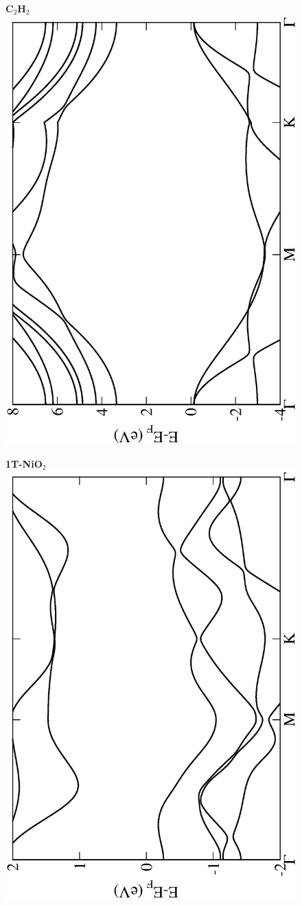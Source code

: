 \begin{figure}[htbp]
\centering
{\bfseries \sffamily C$_{2}$H$_{2}$}\\
\includegraphics[width=0.45\linewidth, angle=-90, trim={2.9cm, 0cm, 2cm, 0cm}, clip]{img/SI_figs/BS/Graphane.eps}
\end{figure}

\begin{figure}[htbp]
\centering
{\bfseries \sffamily 1T-NiO$_{2}$}\\
\includegraphics[width=0.45\linewidth, angle=-90, trim={2.9cm, 0cm, 2cm, 0cm}, clip]{img/SI_figs/BS/1T-NiO2.eps}
\end{figure}

